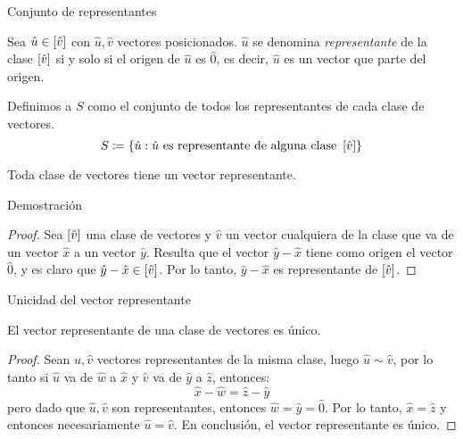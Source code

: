     \begin{frame}{Conjunto de representantes}
        \begin{mdefinition}
            Sea $\hat{u}\in\left[ \hat{v} \right]$ con $\hat{u},\hat{v}$ vectores posicionados. $\hat{u}$ se denomina \emph{representante} de la clase $\left[ \hat{v} \right]$ si y solo si el origen de $\hat{u}$ es $\hat{0}$, es decir, $\hat{u}$ es un vector que parte del origen.\par 
            Definimos a $S$ como el conjunto de todos los representantes de cada clase de vectores.
            \[S\coloneqq\left\{ \hat{u}:\hat{u}\text{ es representante de alguna clase }\left[ \hat{v} \right] \right\}\]
        \end{mdefinition}
        \begin{mtheorem}
            Toda clase de vectores tiene un vector representante.
        \end{mtheorem}
    \end{frame}
    \begin{frame}{Demostración}
        \begin{proof}
            Sea $\left[ \hat{v} \right]$ una clase de vectores y $\hat{v}$ un vector cualquiera de la clase que va de un vector $\hat{x}$ a un vector $\hat{y}$. Resulta que el vector $\hat{y} -\hat{x}$ tiene como origen el vector $\hat{0}$, y es claro que $\hat{y} -\hat{x}\in\left[ \hat{v} \right]$. Por lo tanto, $\hat{y} -\hat{x}$ es representante de $\left[ \hat{v} \right]$.
        \end{proof}
    \end{frame}
    \begin{frame}{Unicidad del vector representante}
        \begin{mtheorem}
            El vector representante de una clase de vectores es único.
        \end{mtheorem}
        \begin{proof}
            Sean $\hat{u}, \hat{v}$ vectores representantes de la misma clase, luego $\hat{u}\sim\hat{v}$, por lo tanto si $\hat{u}$ va de $\hat{w}$ a $\hat{x}$ y $\hat{v}$ va de $\hat{y}$ a $\hat{z}$, entonces:
            \[\hat{x} -\hat{w} =\hat{z} -\hat{y}\]
            pero dado que $\hat{u}, \hat{v}$ son representantes, entonces $\hat{w} =\hat{y} =\hat{0}$. Por lo tanto, $\hat{x} =\hat{z}$ y entonces necesariamente $\hat{u} =\hat{v}$. En conclusión, el vector representante es único.
        \end{proof}
    \end{frame}
